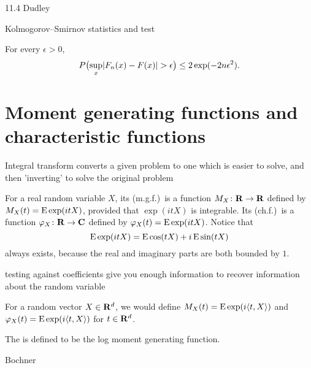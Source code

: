 11.4 Dudley

Kolmogorov--Smirnov statistics and test

\begin{namedthm}
    For every $\epsilon > 0$, 
    \[P\bigl(\sup_{x} \lvert F_n(x) - F(x) \rvert > \epsilon\bigr) \leq 2\exp(-2n\epsilon^2).\]
\end{namedthm}

\section{Moment generating functions and characteristic functions}
Integral transform converts a given problem to one which is easier to solve, and then 'inverting' to solve the original problem

    For a real random variable $X$, its  (m.g.f.)\ is a function $M_X\colon \mathbf{R} \to \mathbf{R}$ defined by $M_X(t) = \mathop{}\!\mathrm{E} \exp(itX)$, provided that $\exp(itX)$ is integrable. Its  (ch.f.)\ is a function $\varphi_X\colon \mathbf{R} \to \mathbf{C}$ defined by $\varphi_X(t) = \mathop{}\!\mathrm{E}\exp(itX)$. Notice that \[
        \mathop{}\!\mathrm{E}\exp(itX) = \mathop{}\!\mathrm{E}\cos(tX) + i\mathop{}\!\mathrm{E}\sin(tX)
    \] always exists, because the real and imaginary parts are both bounded by $1$.

    testing against coefficients give you enough information to recover information about the random variable

    For a random vector $X \in \mathbf{R}^d$, we would define $M_X(t) = \mathop{}\!\mathrm{E} \exp(i\langle t, X \rangle)$ and $\varphi_X(t) = \mathop{}\!\mathrm{E}\exp(i\langle t, X \rangle)$ for $t \in \mathbf{R}^d$.

    The  is defined to be the log moment generating function.

    \cite[Theorem~7.13.1]{Bogachev_2007} Bochner

